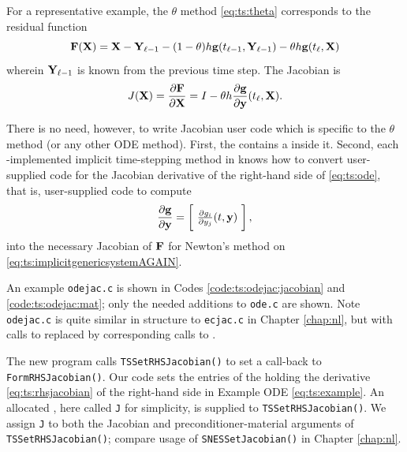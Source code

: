 For a representative example, the $\theta$ method \eqref{eq:ts:theta} corresponds to the residual function
\begin{equation}
  \mathbf{F}(\mathbf{X}) = \mathbf{X} - \mathbf{Y}_{\ell-1} - (1-\theta) h \mathbf{g}(t_{\ell-1},\mathbf{Y}_{\ell-1}) - \theta h \mathbf{g}(t_\ell,\mathbf{X})  \label{eq:ts:thetasystem}
\end{equation}
wherein $\mathbf{Y}_{\ell-1}$ is known from the previous time step.  The Jacobian is
   $$J(\mathbf{X}) = \frac{\partial \mathbf{F}}{\partial \mathbf{X}} = I - \theta h \frac{\partial \mathbf{g}}{\partial \mathbf{y}}(t_\ell,\mathbf{X}).$$

There is no need, however, to write Jacobian user code which is specific to the $\theta$ method (or any other ODE method).  First, the \pTS contains a \pSNES inside it.  Second, each \PETSc-implemented implicit time-stepping method in \pTS knows how to convert user-supplied code for the Jacobian derivative of the right-hand side of \eqref{eq:ts:ode}, that is, user-supplied code to compute
\begin{equation}
\frac{\partial \mathbf{g}}{\partial \mathbf{y}} = \begin{bmatrix}\phantom{\bigg|} \frac{\partial g_i}{\partial y_j}(t,\mathbf{y}) \phantom{\bigg|}\end{bmatrix}, \label{eq:ts:rhsjacobian}
\end{equation}
into the necessary Jacobian of $\mathbf{F}$ for Newton's method on \eqref{eq:ts:implicitgenericsystemAGAIN}.

An example \texttt{odejac.c} is shown in Codes \ref{code:ts:odejac:jacobian} and  \ref{code:ts:odejac:mat}; only the needed additions to \texttt{ode.c} are shown.  Note \texttt{odejac.c} is quite similar in structure to \texttt{ecjac.c} in Chapter \ref{chap:nl}, but with calls to \pSNES replaced by corresponding calls to \pTS.


The new program calls \texttt{TSSetRHSJacobian()} to set a call-back to \texttt{FormRHSJacobian()}.  Our code sets the entries of the \pMat holding the derivative \eqref{eq:ts:rhsjacobian} of the right-hand side in Example ODE \eqref{eq:ts:example}.  An allocated \pMat, here called \texttt{J} for simplicity, is supplied to \texttt{TSSetRHSJacobian()}.  We assign \texttt{J} to both the Jacobian and preconditioner-material arguments of \texttt{TSSetRHSJacobian()}; compare usage of \texttt{SNESSetJacobian()} in Chapter \ref{chap:nl}.

